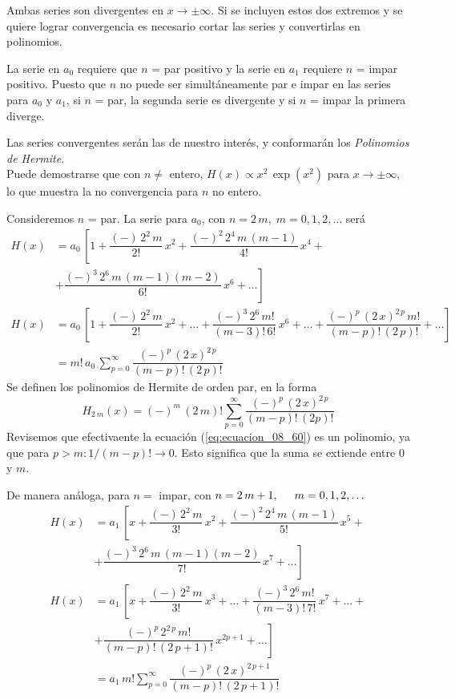Ambas series son divergentes en $x \to \pm \infty$. Si se incluyen estos dos extremos y se quiere lograr convergencia es necesario cortar las series y convertirlas en polinomios.
\par
La serie en $a_{0}$ requiere que $n$ = par positivo y la serie en $a_{1}$ requiere $n$ = impar positivo. Puesto que $n$ no puede ser simultáneamente par e impar en las series para $a_{0}$ y $a_{1}$, si $n$ = par, la segunda serie es divergente y si $n$ = impar la primera diverge.
\par
Las series convergentes serán las de nuestro interés, y conformarán los \emph{Polinomios de Hermite}.
\\
Puede demostrarse que con $n \neq$ entero, $H(x) \propto x^{2} \, \exp(x^{2})$ para $x \to \pm \infty$, lo que muestra la no convergencia para $n$ no entero.
\par
Consideremos $n$ = par. La serie para $a_{0}$, con $n=2\, m, \; m = 0, 1, 2, \ldots$ será
\begin{align*}
H(x) &= a_{0} \, \left[ 1 + \dfrac{(-) \, 2^{2} \, m}{2!} \, x^{2} + \dfrac{(-)^{2} \, 2^{4} \, m \, (m - 1)}{4!} \, x^{4} + \right. \\
&+ \left. \dfrac{(-)^{3} \, 2^{6} \, m \, (m-1)(m-2)}{6!} \, x^{6} + \ldots \right] \\[1em]
H(x) &= a_{0}\, \left[ 1 + \dfrac{(-)\, 2^{2}\, m}{2!} \, x^{2} + \ldots + \dfrac{(-)^{3} \, 2^{6}\, m!}{(m-3)! \, 6!} \, x^{6} + \ldots + \dfrac{(-)^{p} \, (2 \, x)^{2\, p}\, m!}{(m-p)! \, (2\, p)!} + \ldots \right] \\
&= m!\, a_{0} \, \sum_{p=0}^{\infty} \dfrac{(-)^{p}\, (2\, x)^{2\, p}}{(m-p)! \, (2\, p)!}
\end{align*}
Se definen los polinomios de Hermite de orden par, en la forma
\begin{equation}
H_{2\, m} (x) = (-)^{m} \, (2\, m)! \sum_{p=0}^{\infty} \dfrac{(-)^{p} \, (2\, x)^{2\, p}}{(m-p)!\, (2p)!}
\label{eq:ecuacion_08_60}
\end{equation}
Revisemos que efectivaente la ecuación (\ref{eq:ecuacion_08_60}) es un polinomio, ya que para $p > m : 1 / (m-p)! \to 0$. Esto significa que la suma se extiende entre $0$ y $m$.
\par
De manera análoga, para $n=$ impar, con $n = 2 \, m + 1, \hspace{0.5cm} m=0, 1, 2, \ldots$
\begin{align*}
H(x) & = a_{1} \, \left[ x + \dfrac{(-) \, 2^{2} \, m}{3!} \, x^{2} + \dfrac{(-)^{2} \, 2^{4} \, m \, (m - 1)}{5!} \, x^{5} + \right. \\
& + \left. \dfrac{(-)^{3} \, 2^{6} \, m \, (m-1)(m-2)}{7!} \, x^{7} + \ldots \right] \\[1em]
H(x) & = a_{1}\, \left[ x + \dfrac{(-)\, 2^{2}\, m}{3!} \, x^{3} + \ldots + \dfrac{(-)^{3} \, 2^{6}\, m!}{(m-3)! \, 7!} \, x^{7} + \ldots + \right. \\
&+  \left. \dfrac{(-)^{p} \, 2^{2 \, p} \, m!}{(m-p)! \, (2\, p + 1)!} \, x^{2p+1} + \ldots \right] \\
& = a_{1} \, m! \sum_{p=0}^{\infty} \dfrac{(-)^{p}\, (2\, x)^{2\, p+1}}{(m-p)! \, (2\, p + 1)!}  
\end{align*}
